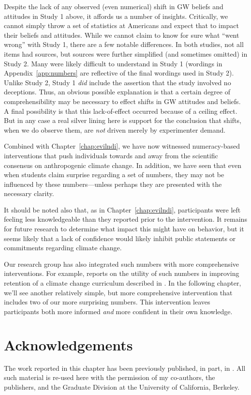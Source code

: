Despite the lack of any observed (even numerical) shift in GW beliefs and
attitudes in Study 1 above, it affords us a number of insights.  Critically, we
cannot simply throw a set of statistics at Americans and expect that to impact
their beliefs and attitudes. While we cannot claim to know for sure what “went
wrong” with Study 1, there are a few notable differences.  In both studies, not
all items had sources, but sources were further simplified (and sometimes
omitted) in Study 2. Many were likely difficult to understand in Study 1
(wordings in Appendix~\ref{app:numbers} are reflective of the final wordings
used in Study 2). Unlike Study 2, Study 1 \emph{did} include the assertion that
the study involved no deceptions. Thus, an obvious possible explanation is that
a certain degree of comprehensibility may be necessary to effect shifts in GW
attitudes and beliefs. A final possibility is that this lack-of-effect occurred
because of a ceiling effect.  But in any case a real silver lining here is
support for the conclusion that shifts, when we do observe them, are \emph{not}
driven merely by experimenter demand.

Combined with Chapter~\ref{chap:evilndi}, we have now witnessed numeracy-based
interventions that push individuals towards and away from the scientific
consensus on anthropogenic climate change. In addition, we have seen that even
when students claim surprise regarding a set of numbers, they may not be
influenced by these numbers---unless perhaps they are presented with the
necessary clarity.

It should be noted also that, as in Chapter~\ref{chap:evilndi}, participants were
left feeling less knowledgeable than they reported prior to the intervention. It
remains for future research to determine what impact this might have on
behavior, but it seems likely that a lack of confidence would likely
inhibit public statements or commitments regarding climate change.

Our research group has also integrated such numbers with  more comprehensive
interventions. For example, \textcite{clark_knowledge_inpress} reports on the
utility of such numbers in improving retention of a climate change curriculum
described in \textcite{felipe_numerical_2012}. In the following chapter, we'll
see another relatively simple, but more comprehensive intervention that includes two
of our more surprising numbers. This intervention leaves participants both more informed
\emph{and} more confident in their own knowledge.

\section*{Acknowledgements}

The work reported in this chapter has been previously published, in part, in
\textcite{clark_knowledge_inpress}.  All such material is re-used here with the
permission of my co-authors, the publishers, and the Graduate Division at the
University of California, Berkeley.
